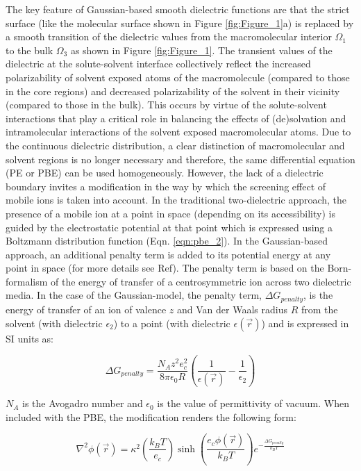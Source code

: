\documentclass[9pt,tutorial,pubversion]{livecoms}
\begin{document}
The key feature of Gaussian-based smooth dielectric functions are that the strict surface (like the molecular surface shown in Figure \ref{fig:Figure_1}a) is replaced by a smooth transition of the dielectric values from the macromolecular interior $ \Omega_1 $ to the bulk $ \Omega_3 $ as shown in Figure \ref{fig:Figure_1}. The transient values of the dielectric at the solute-solvent interface collectively reflect the increased polarizability of solvent exposed atoms of the macromolecule (compared to those in the core regions) and decreased polarizability of the solvent in their vicinity (compared to those in the bulk). This occurs by virtue of the solute-solvent interactions that play a critical role in balancing the effects of (de)solvation and intramolecular interactions of the solvent exposed macromolecular atoms. 
Due to the continuous dielectric distribution, a clear distinction of macromolecular and solvent regions is no longer necessary and therefore, the same differential equation (PE or PBE) can be used homogeneously. However, the lack of a dielectric boundary invites a modification in the way by which the screening effect of mobile ions is taken into account. In the traditional two-dielectric approach, the presence of a mobile ion at a point in space (depending on its accessibility) is guided by the electrostatic potential at that point which is expressed using a Boltzmann distribution function (Eqn. \ref{eqn:pbe_2}). In the Gaussian-based approach, an additional penalty term is added to its potential energy at any point in space (for more details see Ref\cite{jia2017treating}). The penalty term is based on the Born-formalism of the energy of transfer of a centrosymmetric ion across two dielectric media. In the case of the Gaussian-model, the penalty term, $ \Delta G_{penalty} $, is the energy of transfer of an ion of valence $ z $ and Van der Waals radius $ R $ from the solvent (with dielectric $ \epsilon_2 $) to a point  (with dielectric $ \epsilon(\Vec{r})$) and is expressed in SI units as:

\begin{equation}
\Delta G_{penalty} = \frac{N_Az^2e_c^2}{8\pi\epsilon_0 R} \left( \frac{1}{\epsilon(\Vec{r})} - \frac{1}{\epsilon_2} \right)
\end{equation}

$ N_A $ is the Avogadro number and $ \epsilon_0 $ is the value of permittivity of vacuum. When included with the PBE, the modification renders the following form:

\begin{equation}
\nabla^2\phi(\Vec{r}) = \kappa^2 \left (\frac{k_BT}{e_c} \right) \sinh\left({\frac{e_c\phi(\Vec{r})}{k_BT}} \right) e^{-\frac{\Delta G_{penalty}}{k_B T}}
\end{equation}
\end{document}
